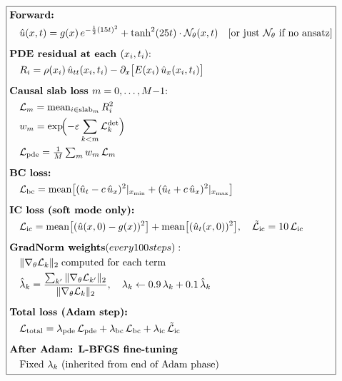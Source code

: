 \documentclass[11pt, a4paper]{article}
\begin{document}
\begin{equation*}
\boxed{
\begin{aligned}
&\textbf{Forward:}\\
&\quad \hat{u}(x,t) = g(x)\,e^{-\frac{1}{2}(15t)^2}
      + \tanh^2(25t)\cdot\mathcal{N}_\theta(x,t)
      \quad[\text{or just } \mathcal{N}_\theta \text{ if no ansatz}]\\[6pt]
&\textbf{PDE residual at each }(x_i, t_i)\text{:}\\
&\quad R_i = \rho(x_i)\,\hat{u}_{tt}(x_i,t_i)
           - \partial_x\bigl[E(x_i)\,\hat{u}_x(x_i,t_i)\bigr]\\[6pt]
&\textbf{Causal slab loss } m = 0,\ldots,M{-}1\text{:}\\
&\quad \mathcal{L}_m = \mathrm{mean}_{i\in\mathrm{slab}_m}\,R_i^2 \\
&\quad w_m = \exp\!\Bigl(-\varepsilon\sum_{k<m}\mathcal{L}_k^{\det}\Bigr) \\
&\quad \mathcal{L}_{\mathrm{pde}} = \tfrac{1}{M}\textstyle\sum_m w_m\,\mathcal{L}_m \\[6pt]
&\textbf{BC loss:}\\
&\quad \mathcal{L}_{\mathrm{bc}} = \mathrm{mean}\bigl[
      (\hat{u}_t - c\,\hat{u}_x)^2|_{x_{\min}} +
      (\hat{u}_t + c\,\hat{u}_x)^2|_{x_{\max}}\bigr]\\[6pt]
&\textbf{IC loss (soft mode only):}\\
&\quad \mathcal{L}_{\mathrm{ic}} = \mathrm{mean}\bigl[(\hat{u}(x,0)-g(x))^2\bigr]
      + \mathrm{mean}\bigl[(\hat{u}_t(x,0))^2\bigr],
      \quad \tilde{\mathcal{L}}_{\mathrm{ic}} = 10\,\mathcal{L}_{\mathrm{ic}}\\[6pt]
&\textbf{GradNorm weights} (every 100 steps):\\
&\quad \|\nabla_\theta \mathcal{L}_k\|_2 \;\text{computed for each term}\\
&\quad \hat{\lambda}_k = \frac{\sum_{k'}\|\nabla_\theta \mathcal{L}_{k'}\|_2}
                              {\|\nabla_\theta \mathcal{L}_k\|_2},
      \quad \lambda_k \leftarrow 0.9\,\lambda_k + 0.1\,\hat{\lambda}_k\\[6pt]
&\textbf{Total loss (Adam step):}\\
&\quad \mathcal{L}_{\mathrm{total}} =
      \lambda_{\mathrm{pde}}\,\mathcal{L}_{\mathrm{pde}}
    + \lambda_{\mathrm{bc}}\,\mathcal{L}_{\mathrm{bc}}
    + \lambda_{\mathrm{ic}}\,\tilde{\mathcal{L}}_{\mathrm{ic}}\\[6pt]
&\textbf{After Adam:  L-BFGS fine-tuning}\\
&\quad \text{Fixed }\lambda_k\text{ (inherited from end of Adam phase)}
\end{aligned}
}
\end{equation*}
\end{document}
